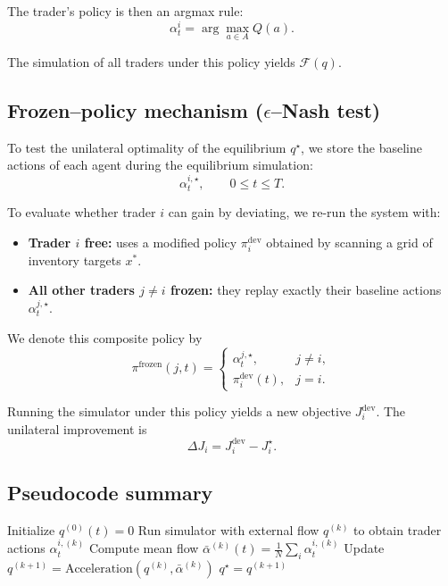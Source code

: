 \documentclass[11pt]{article}
\theoremstyle{definition}
\begin{document}
The trader's policy is then an argmax rule:
\[
\alpha^i_t = \arg\max_{a\in A} Q(a).
\]

The simulation of all traders under this policy yields $\mathcal{F}(q)$.

\subsection*{Frozen–policy mechanism ($\epsilon$–Nash test)}
\label{subsec:frozenpolicy}

To test the unilateral optimality of the equilibrium $q^\star$,  
we store the baseline actions of each agent during the equilibrium 
simulation:
\[
\alpha^{i,\star}_t,\qquad 0\le t\le T.
\]

To evaluate whether trader $i$ can gain by deviating, we re-run the system 
with:
\begin{itemize}
    \item \textbf{Trader $i$ free:} uses a modified policy $\pi_{i}^{\mathrm{dev}}$ obtained by scanning a grid of inventory targets $x^*$. 
    \item \textbf{All other traders $j\neq i$ frozen:} they replay exactly their baseline actions $\alpha^{j,\star}_t$.
\end{itemize}

We denote this composite policy by 
\[
\pi^{\mathrm{frozen}}(j,t) =
\begin{cases}
\alpha^{j,\star}_t, & j\neq i,\\
\pi_{i}^{\mathrm{dev}}(t), & j=i.
\end{cases}
\]

Running the simulator under this policy yields a new objective $J_i^{\mathrm{dev}}$.
The unilateral improvement is
\[
\Delta J_i = J_i^{\mathrm{dev}} - J_i^\star.
\]
\subsection*{Pseudocode summary}

\begin{algorithm}[H]
\caption{Fixed–point solver}
\begin{algorithmic}[1]
\State Initialize $q^{(0)}(t)=0$
    \State Run simulator with external flow $q^{(k)}$ to obtain 
           trader actions $\alpha^{i,(k)}_t$
    \State Compute mean flow 
           $\bar\alpha^{(k)}(t)=\frac1N\sum_i\alpha^{i,(k)}_t$
    \State Update $q^{(k+1)} = \text{Acceleration}(q^{(k)},\bar\alpha^{(k)})$
        \State \Return $q^\star = q^{(k+1)}$
    \EndIf
\EndFor
\end{algorithmic}
\end{algorithm}
\end{document}
